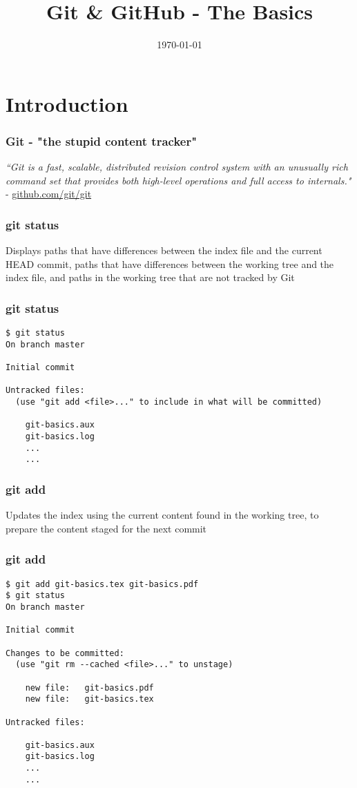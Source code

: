 \documentclass{beamer}
\title[Git]{Git \& GitHub - The Basics} %
\author{} %
\institute[] %
{
 \\ %
\medskip
\textit{chris@cjwfuller.com}
}
\date{\today}
\begin{document}
\begin{frame}
\titlepage
\end{frame}

\section{Introduction}

\begin{frame}
\frametitle{Git - "the stupid content tracker"}
\textit{``Git is a fast, scalable, distributed revision control system with an unusually rich command set that provides both high-level operations and full access to internals."} - \url{github.com/git/git}
\end{frame}


\begin{frame}
\frametitle{git status}
Displays paths that have differences between the index file and the current HEAD commit, paths that have differences between the working tree and the index file, and paths in the working tree that are not tracked by Git
\end{frame}


\begin{frame}[fragile]
\frametitle{git status}
	\scriptsize
	\begin{verbatim}
$ git status
On branch master

Initial commit

Untracked files:
  (use "git add <file>..." to include in what will be committed)

	git-basics.aux
	git-basics.log
	...
	...
	\end{verbatim}
\end{frame}



\begin{frame}
\frametitle{git add}
Updates the index using the current content found in the working tree, to prepare the content staged for the next commit
\end{frame}


\begin{frame}[fragile]
\frametitle{git add}
	\scriptsize
	\begin{verbatim}
$ git add git-basics.tex git-basics.pdf
$ git status
On branch master

Initial commit

Changes to be committed:
  (use "git rm --cached <file>..." to unstage)

	new file:   git-basics.pdf
	new file:   git-basics.tex

Untracked files:

	git-basics.aux
	git-basics.log
	...
	...
	\end{verbatim}
\end{frame}
\end{document}
